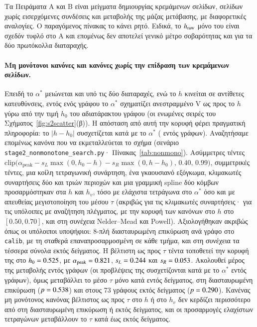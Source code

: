 \documentclass[11pt,a4paper]{article}
\theoremstyle{definition}
\theoremstyle{remark}
\newcommand{\clip}{\mathrm{clip}}
\begin{document}




Τα Πειράματα Α και Β είναι μείγματα δημιουργίας κρεμάμενων σελίδων, σελίδων χωρίς εισερχόμενες
συνδέσεις και μεταβολής της μάζας μετάβασης, με διαφορετικές αναλογίες. Ο παραγόμενος πίνακας
το κάνει ρητό. Ειδικά, το $h_{\rm raw}$ μόνο του είναι σχεδόν τυφλό στο Α και επομένως δεν αποτελεί
γενικό μέτρο σοβαρότητας και για τα δύο πρωτόκολλα διαταραχής.

\paragraph{Μη μονότονοι κανόνες και κανόνες χωρίς την επίδραση των κρεμάμενων σελίδων.}
Επειδή το $\alpha^*$ μειώνεται και υπό τις δύο διαταραχές, ενώ το $h$ κινείται σε αντίθετες
κατευθύνσεις, εντός ενός γράφου το $\alpha^*$ σχηματίζει ανεστραμμένο V ως προς το $h$ γύρω από την τιμή
$h_0$ του αδιατάρακτου γράφου (οι ενωμένες σειρές του Σχήματος~\ref{fig:s2scatter}(β)). Η απόσταση από
αυτή την κορυφή φέρει πραγματική πληροφορία: το $|h-h_0|$ συσχετίζεται κατά \NmDistOwn{} με το
$\alpha^*$ (\NmDistOwnWithin{} εντός γράφων). Αναζητήσαμε επομένως κανόνα που να εκμεταλλεύεται το σχήμα
(σενάριο \texttt{stage2\_nonmonotone\_search.py}· Πίνακας~\ref{tab:nonmono}). Ασύμμετρες τέντες
$\clip\bigl(\alpha_{\mathrm{peak}}-s_L\max(0,h_0-h)-s_R\max(0,h-h_0),\,0.40,\,0.99\bigr)$, συμμετρικές
τέντες, μια κοίλη τετραγωνική συνάρτηση, ένα γκαουσιανό εξόγκωμα, κλιμακωτές συναρτήσεις δύο και τριών
περιοχών και μια γραμμική spline δύο κόμβων προσαρμόστηκαν στα $h$ και $h_v$, τόσο με ελάχιστα
τετράγωνα στο $\alpha^*$ όσο και με απευθείας μεγιστοποίηση του μέσου $\tau$ (ακριβώς για τις
κλιμακωτές συναρτήσεις· για τις υπόλοιπες με αναζήτηση πλέγματος, με την κορυφή των κανόνων στο $h$ στο
$[0.50,0.70]$, και στη συνέχεια Nelder--Mead και Powell). Αξιολογήθηκαν ακριβώς όπως οι
υπόλοιποι υποψήφιοι: 8-πλή διασταυρωμένη επικύρωση ανά γράφο στο \texttt{calib}, με τη σταθερά
επαναπροσαρμοσμένη σε κάθε τμήμα, και στη συνέχεια τα τέσσερα σύνολα εκτός δείγματος. Η βέλτιστη ως προς
$\tau$ τέντα τοποθετεί την κορυφή της στο $h_0=0.525$, με $\alpha_{\mathrm{peak}}=0.821$,
$s_L=0.244$ και $s_R=0.053$. Ακολουθεί μέρος της μεταβολής εντός γράφων (οι προβλέψεις της
συσχετίζονται κατά \NmTentWithin{} με το $\alpha^*$ εντός γράφων), όμως μεταβάλλει το μέσο $\tau$ μόνο
κατά \NmTentCalib{} εντός δείγματος, \NmTentCV{} στη διασταυρωμένη επικύρωση ($p=0.538$) και
\NmTentHeld{} στους 73 γράφους εκτός δείγματος ($p=0.290$). Κανένας μη μονότονος κανόνας βέλτιστος ως προς $\tau$ στο $h$
ή στο $h_v$ δεν κερδίζει περισσότερο από \NmMaxOneDCV{} στη διασταυρωμένη επικύρωση ή \NmMaxOneDHeld{}
εκτός δείγματος, και οι προσαρμογές ελαχίστων τετραγώνων μεταβάλλουν το $\tau$ κατά \NmLSBest{} έως
\NmLSWorst{} εκτός δείγματος.
\end{document}
